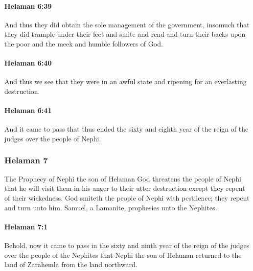 		\paragraph{Helaman 6:39} %
			\label{HELAMAN-6-39}

			And thus they did obtain the sole management of the government,
			insomuch that they did trample under their feet and smite and rend
			and turn their backs upon the poor and the meek and humble followers of God.

		\paragraph{Helaman 6:40} %
			\label{HELAMAN-6-40}

			And thus we see that they were in an awful state
			and ripening for an everlasting destruction.

		\paragraph{Helaman 6:41} %
			\label{HELAMAN-6-41}

			And it came to pass that thus ended the sixty and eighth year
			of the reign of the judges over the people of Nephi.

	\subsubsection{Helaman 7} %
		\label{HELAMAN-7}
		
		The Prophecy of Nephi
		the son of Helaman
		God threatens the people of Nephi
		that he will visit them in his anger to their utter destruction
		except they repent of their wickedness.
		God smiteth the people of Nephi with pestilence;
		they repent and turn unto him.
		Samuel, a Lamanite, prophesies unto the Nephites.
		
		\paragraph{Helaman 7:1} %
			\label{HELAMAN-7-1}

			Behold, now it came to pass in the sixty and ninth year
			of the reign of the judges over the people of the Nephites
			that Nephi the son of Helaman returned
			to the land of Zarahemla from the land northward.

